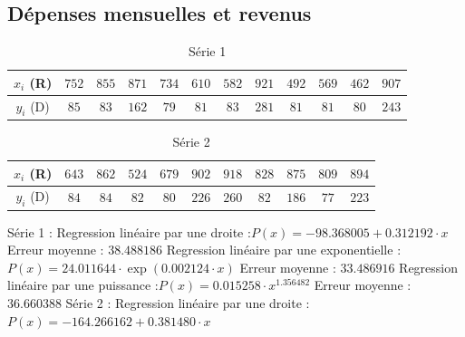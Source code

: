 \documentclass{report}
\begin{document}
      \subsection{Dépenses mensuelles et revenus}
	\begin{table}[h]
	  \centering
	  \begin{tabular}{| c | c | c | c | c | c | c | c | c | c | c | c |}
	    \hline 
	    $x_{i}$ (R) & $752$ & $855$ & $871$ & $734$ & $610$ & $582$ & $921$ & $492$ & $569$ & $462$ & $907 $ \\ 
	    \hline 
	    $y_{i}$ (D) & $85$ & $83$ & $162$ & $79$ & $81$ & $83$ & $281$ & $81$ & $81$ & $80$ & $243 $ \\ 
	    \hline 
	  \end{tabular}
	  \caption{Série 1}
	  \label{approx_tp2_ex3_1}
	\end{table}
	\begin{table}[h]
	  \centering
	  \begin{tabular}{| c | c | c | c | c | c | c | c | c | c | c |}
	  \hline 
	  $x_{i}$ (R) & $643$ & $862$ & $524$ & $679$ & $902$ & $918$ & $828$ & $875$ & $809$ & $894$ \\ 
	  \hline 
	  $y_{i}$ (D) & $84$ & $84$ & $82$ & $80$ & $226$ & $260$ & $82$ & $186$ & $77$ & $223$ \\ 
	  \hline 
	  \end{tabular}
	  \caption{Série 2}
	  \label{approx_tp2_ex3_2}
	\end{table}
	Série 1 :
	\newline
	Regression linéaire par une droite :$ P(x) =  - 98.368005 + 0.312192 \cdot x$
	\newline
	Erreur moyenne : $38.488186$
	\newline
	\newline
	Regression linéaire par une exponentielle :$P(x) = 24.011644 \cdot \exp(0.002124 \cdot x)$
	\newline
	Erreur moyenne : $33.486916$
	\newline
	\newline
	Regression linéaire par une puissance :$P(x) = 0.015258 \cdot x^{1.356482}$
	\newline
	Erreur moyenne : $36.660388$
	\newline 
	\newline
	\newline
	Série 2 :
	\newline
	Regression linéaire par une droite :$P(x) =  - 164.266162 + 0.381480 \cdot x$
	\newline
\end{document}
